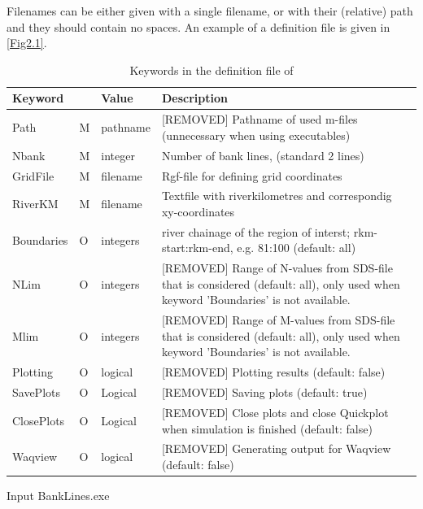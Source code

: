 Filenames can be either given with a single filename, or with their (relative) path and they should contain no spaces.
An example of a definition file is given in \autoref{Fig2.1}.

\begin{table}
\begin{tabular}{lllp{5cm}}
Keyword &  & Value & Description \\ \hline
Path & M & pathname & [REMOVED] Pathname of used m-files (unnecessary when using executables) \\
Nbank & M & integer & Number of bank lines, (standard 2 lines) \\
GridFile  & M & filename & Rgf-file for defining grid coordinates \\
RiverKM & M & filename & Textfile with riverkilometres and correspondig xy-coordinates \\
Boundaries  & O & integers & river chainage of the region of interst;  rkm-start:rkm-end, e.g. 81:100 (default: all) \\
NLim & O & integers & [REMOVED] Range of N-values from SDS-file that is considered (default: all), only used when keyword 'Boundaries' is not available. \\
Mlim & O & integers & [REMOVED] Range of M-values from SDS-file that is considered (default: all), only used when keyword 'Boundaries' is not available. \\
Plotting & O & logical & [REMOVED] Plotting results (default: false) \\
SavePlots & O & Logical & [REMOVED] Saving plots (default: true) \\
ClosePlots & O & Logical & [REMOVED] Close plots and close Quickplot when simulation is finished (default: false) \\
Waqview & O & logical & [REMOVED] Generating output for Waqview (default: false) \\ \hline
\end{tabular}
\caption{Keywords in the definition file of \dfastbe}
\label{Tab2.2}
\end{table}

Input BankLines.exe

